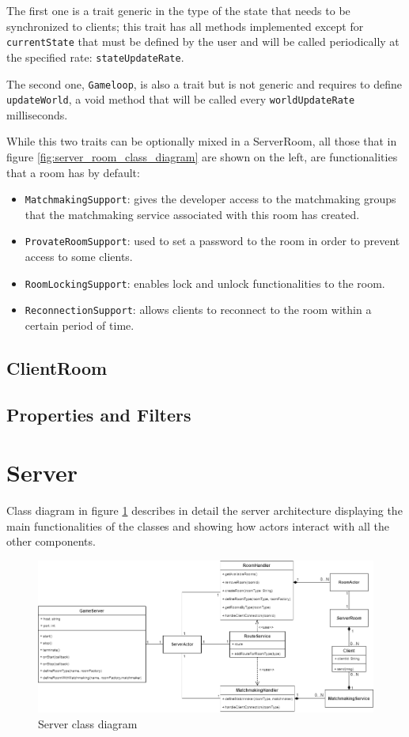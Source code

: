 The first one is a trait generic in the type of the state that needs to be synchronized to clients; this trait has all methods implemented except for \texttt{currentState} that must be defined by the user and will be called periodically at the specified rate: \texttt{stateUpdateRate}.

The second one, \texttt{Gameloop}, is also a trait but is not generic and requires to define \texttt{updateWorld}, a void method that will be called every \texttt{worldUpdateRate} milliseconds.

While this two traits can be optionally mixed in a ServerRoom, all those that in figure \ref{fig:server_room_class_diagram} are shown on the left, are functionalities that a room has by default:
\begin{itemize}
	\item \texttt{MatchmakingSupport}: gives the developer access to the matchmaking groups that the matchmaking service associated with this room has created.
	\item \texttt{ProvateRoomSupport}: used to set a password to the room in order to prevent access to some clients.
	\item \texttt{RoomLockingSupport}: enables lock and unlock functionalities to the room. 
	\item \texttt{ReconnectionSupport}: allows clients to reconnect to the room within a certain period of time.
\end{itemize}

\subsection{ClientRoom}

\subsection{Properties and Filters}

\section{Server}
Class diagram in figure \ref{fig:server_class_diagram} describes in detail the server architecture displaying the main functionalities of the classes and showing how actors interact with all the other components. 
\begin{figure}[h]
	\hspace*{-1.1in}
	\includegraphics[scale=0.55]{images/4-design/server_class.png}
	\caption{Server class diagram}
	\label{fig:server_class_diagram}
\end{figure}

